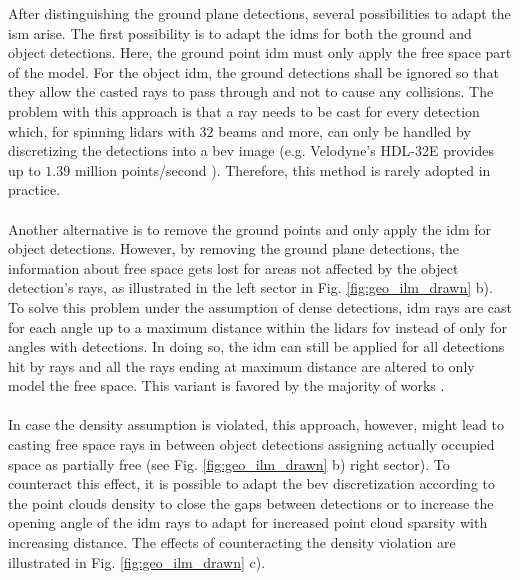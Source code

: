 After distinguishing the ground plane detections, several possibilities to adapt the \gls{ism} arise. The first possibility is to adapt the \gls{idm}s for both the ground and object detections. Here, the ground point \gls{idm} must only apply the free space part of the model. For the object \gls{idm}, the ground detections shall be ignored so that they allow the casted rays to pass through and not to cause any collisions. The problem with this approach is that a ray needs to be cast for every detection which, for spinning lidars with $32$ beams and more, can only be handled by discretizing the detections into a \gls{bev} image (e.g. Velodyne's HDL-32E provides up to $1.39$ million points/second \cite{VelHDL32}). Therefore, this method is rarely adopted in practice.
\\\\
Another alternative is to remove the ground points and only apply the \gls{idm} for object detections. However, by removing the ground plane detections, the information about free space gets lost for areas not affected by the object detection's rays, as illustrated in the left sector in Fig. \ref{fig:geo_ilm_drawn} b). To solve this problem under the assumption of dense detections, \gls{idm} rays are cast for each angle up to a maximum distance within the lidars \gls{fov} instead of only for angles with detections. In doing so, the \gls{idm} can still be applied for all detections hit by rays and all the rays ending at maximum distance are altered to only model the free space. This variant is favored by the majority of works \cite{thrun2006stanley,narksri2018slope,fischler1981random,hough1962method,oliveira2016scene,tian2020fast}.
\\\\
In case the density assumption is violated, this approach, however, might lead to casting free space rays in between object detections assigning actually occupied space as partially free (see Fig. \ref{fig:geo_ilm_drawn} b) right sector). To counteract this effect, it is possible to adapt the \gls{bev} discretization according to the point clouds density to close the gaps between detections or to increase the opening angle of the \gls{idm} rays to adapt for increased point cloud sparsity with increasing distance. The effects of counteracting the density violation are illustrated in Fig. \ref{fig:geo_ilm_drawn} c).  
